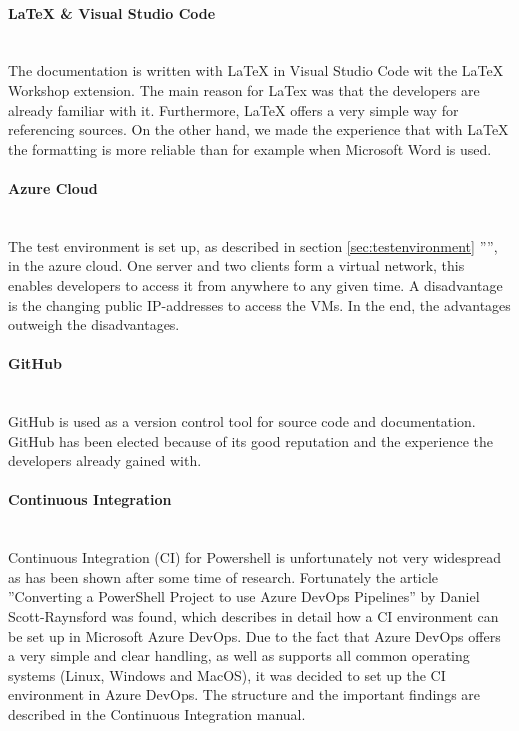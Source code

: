 \paragraph{LaTeX \& Visual Studio Code}\ \\
The documentation is written with LaTeX in Visual Studio Code wit the LaTeX Workshop extension. The main reason for LaTex was that the developers are already familiar with it. Furthermore, LaTeX offers a very simple way for referencing sources. On the other hand, we made the experience that with LaTeX the formatting is more reliable than for example when Microsoft Word is used.

\paragraph{Azure Cloud}\ \\
The test environment is set up, as described in section \ref{sec:testenvironment} '''', in the azure cloud. One server and two clients form a virtual network, this enables developers to access it from anywhere to any given time. A disadvantage is the changing public IP-addresses to access the VMs. In the end, the advantages outweigh the disadvantages.

\paragraph{GitHub}\ \\
GitHub is used as a version control tool for source code and documentation. GitHub has been elected because of its good reputation and the experience the developers already gained with.

\paragraph{Continuous Integration}\ \\
Continuous Integration (CI) for Powershell is unfortunately not very widespread as has been shown after some time of research. Fortunately the article ''Converting a PowerShell Project to use Azure DevOps Pipelines'' \cite{CI} by Daniel Scott-Raynsford was found, which describes in detail how a CI environment can be set up in Microsoft Azure DevOps. Due to the fact that Azure DevOps offers a very simple and clear handling, as well as supports all common operating systems (Linux, Windows and MacOS), it was decided to set up the CI environment in Azure DevOps. The structure and the important findings are described in the Continuous Integration manual.

